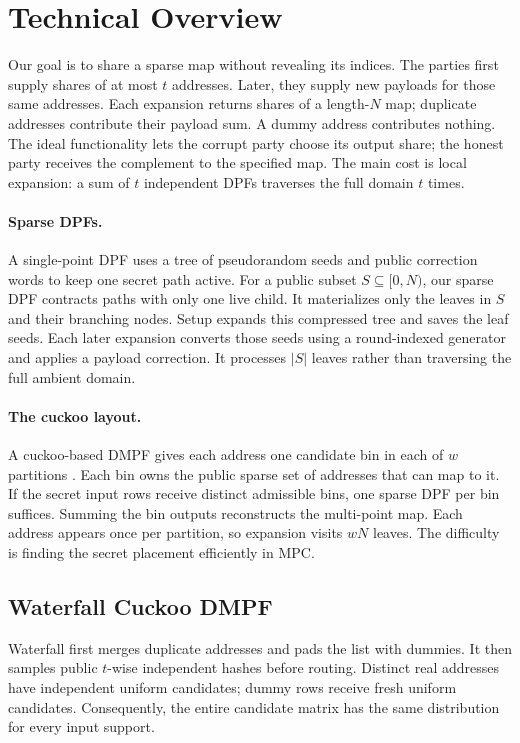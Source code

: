 \section{Technical Overview}

Our goal is to share a sparse map without revealing its indices.
The parties first supply shares of at most $t$ addresses.
Later, they supply new payloads for those same addresses.
Each expansion returns shares of a length-$N$ map; duplicate addresses
contribute their payload sum.
A dummy address contributes nothing.
The ideal functionality lets the corrupt party choose its output share;
the honest party receives the complement to the specified map.
The main cost is local expansion: a sum of $t$ independent DPFs traverses
the full domain $t$ times.

\paragraph{Sparse DPFs.}
A single-point DPF uses a tree of pseudorandom seeds and public correction
words to keep one secret path active. For a public subset $S\subseteq[0,N)$,
our sparse DPF contracts paths with only one live child.
It materializes only the leaves in $S$ and their branching nodes.
Setup expands this compressed tree and saves the leaf seeds.
Each later expansion converts those seeds using a round-indexed generator
and applies a payload correction. It processes $|S|$ leaves rather than
traversing the full ambient domain.

\paragraph{The cuckoo layout.}
A cuckoo-based DMPF gives each address one candidate bin in each of $w$
partitions \cite{fssBatchCodes,cuckooDmpf}.
Each bin owns the public sparse set of addresses that can map to it.
If the secret input rows receive distinct admissible bins, one sparse DPF
per bin suffices. Summing the bin outputs reconstructs the multi-point map.
Each address appears once per partition, so expansion visits $wN$ leaves.
The difficulty is finding the secret placement efficiently in MPC.

\subsection{Waterfall Cuckoo DMPF}

Waterfall first merges duplicate addresses and pads the list with dummies.
It then samples public $t$-wise independent hashes before routing.
Distinct real addresses have independent uniform candidates; dummy rows
receive fresh uniform candidates.
Consequently, the entire candidate matrix has the same distribution for
every input support.

